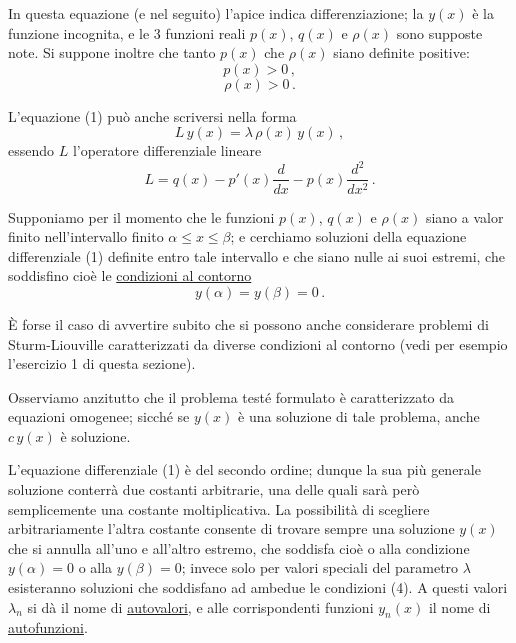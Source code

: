 \documentclass[11pt, a4paper]{book}
\numberwithin{equation}{section}
\begin{document}
In questa equazione (e nel seguito) l'apice indica differenziazione; la $y(x)$ è la funzione incognita, e le 3 funzioni reali $p(x)$, $q(x)$ e $\rho(x)$ sono supposte note. Si suppone inoltre che tanto $p(x)$ che $\rho(x)$ siano definite positive:
\begin{equation}
p(x)>0\,, \tag{2a}
\end{equation}
\begin{equation}
\rho(x)>0\,. \tag{2b}
\end{equation}

L'equazione (1) può anche scriversi nella forma
\begin{equation}
L\,y(x)=\lambda\,\rho(x)\,y(x)\,, \tag{1b}
\end{equation}
essendo $L$ l'operatore differenziale lineare
\begin{equation}
L = q(x) - p'(x)\frac{d}{dx} - p(x)\frac{d^2}{dx^2}\,. \tag{3}
\end{equation}

Supponiamo per il momento che le funzioni $p(x)$, $q(x)$ e $\rho(x)$ siano a valor finito nell'intervallo finito $\alpha\leq x\leq\beta$; e cerchiamo soluzioni della equazione differenziale (1) definite entro tale intervallo e che siano nulle ai suoi estremi, che soddisfino cioè le \uline{condizioni al contorno}
\begin{equation}
y(\alpha)=y(\beta)=0\,. \tag{4}
\end{equation}

È forse il caso di avvertire subito che si possono anche considerare problemi di Sturm-Liouville caratterizzati da diverse condizioni al contorno (vedi per esempio l'esercizio 1 di questa sezione).

Osserviamo anzitutto che il problema testé formulato è caratterizzato da equazioni omogenee; sicché se $y(x)$ è una soluzione di tale problema, anche $c\,y(x)$ è soluzione.

L'equazione differenziale (1) è del secondo ordine; dunque la sua più generale soluzione conterrà due costanti arbitrarie, una delle quali sarà però semplicemente una costante moltiplicativa. La possibilità di scegliere arbitrariamente l'altra costante consente di trovare sempre una soluzione $y(x)$ che si annulla all'uno e all'altro estremo, che soddisfa cioè o alla condizione $y(\alpha)=0$ o alla $y(\beta)=0$; invece solo per valori speciali del parametro $\lambda$ esisteranno soluzioni che soddisfano ad ambedue le condizioni (4). A questi valori $\lambda_n$ si dà il nome di \uline{autovalori}, e alle corrispondenti funzioni $y_n(x)$ il nome di \uline{autofunzioni}.
\end{document}
